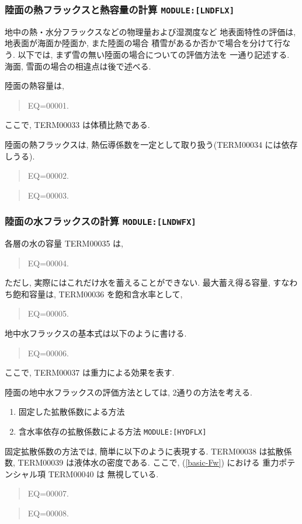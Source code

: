 \subsubsection{陸面の熱フラックスと熱容量の計算 \texttt{MODULE:[LNDFLX]}}

地中の熱・水分フラックスなどの物理量および湿潤度など
地表面特性の評価は, 地表面が海面か陸面か, また陸面の場合
積雪があるか否かで場合を分けて行なう. 
以下では, まず雪の無い陸面の場合についての評価方法を
一通り記述する. 海面, 雪面の場合の相違点は後で述べる. 

陸面の熱容量は,
\begin{quote}
EQ=00001.
\end{quote}
ここで, TERM00033 は体積比熱である.

陸面の熱フラックスは, 熱伝導係数を一定として取り扱う(TERM00034 には依存しうる).
\begin{quote}
EQ=00002.
\end{quote}
\begin{quote}
EQ=00003.
\end{quote}

\subsubsection{陸面の水フラックスの計算 \texttt{MODULE:[LNDWFX]}}

各層の水の容量 TERM00035 は, 
\begin{quote}
EQ=00004.
\end{quote}
ただし, 実際にはこれだけ水を蓄えることができない.
最大蓄え得る容量, すなわち飽和容量は, TERM00036 を飽和含水率として,
\begin{quote}
EQ=00005.
\end{quote}

地中水フラックスの基本式は以下のように書ける. 
\begin{quote}
EQ=00006.
\label{basic-Fw}
\end{quote}
ここで, TERM00037 は重力による効果を表す. 

陸面の地中水フラックスの評価方法としては, 2通りの方法を考える.
\begin{enumerate}
\item 固定した拡散係数による方法
\item 含水率依存の拡散係数による方法 \texttt{MODULE:[HYDFLX]}
\end{enumerate}

固定拡散係数の方法では, 簡単に以下のように表現する.
TERM00038 は拡散係数, TERM00039 は液体水の密度である.
ここで, (\ref{basic-Fw}) における 重力ポテンシャル項 TERM00040 は
無視している. 
\begin{quote}
EQ=00007.
\end{quote}
\begin{quote}
EQ=00008.
\end{quote}

